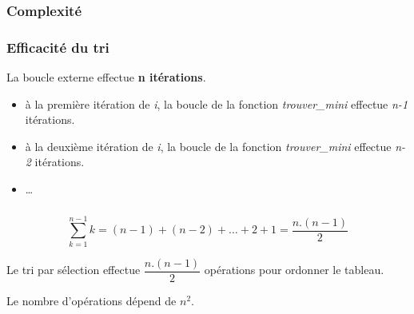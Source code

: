 \documentclass[svgnames,11pt]{beamer}
\begin{document}
\subsubsection{Complexité}
\begin{frame}[fragile]
    \frametitle{Efficacité du tri}
    \begin{center}
        La boucle externe effectue \textbf{n itérations}.
    \end{center}
    \begin{itemize}
        \item à la première itération de \emph{i}, la boucle de la fonction \emph{trouver\_mini} effectue \emph{n-1} itérations.
        \begin{center}
            \end{center}
        \item à la deuxième itération de \emph{i}, la boucle de la fonction \emph{trouver\_mini} effectue \emph{n-2} itérations.
        \begin{center}
            \end{center}
        \item \dots
    \end{itemize}
    
\end{frame}

\begin{frame}
    \frametitle{}
    $$\sum_{k=1}^{n-1}{k}=(n-1)+(n-2)+\dots+2+1=\dfrac{n.(n-1)}{2}$$
    \begin{aretenir}[]
        Le tri par sélection effectue $\dfrac{n.(n-1)}{2}$ opérations pour ordonner le tableau. 
        
        \centering Le nombre d'opérations dépend de $n^2$.
    \end{aretenir}

\end{frame}
\end{document}
